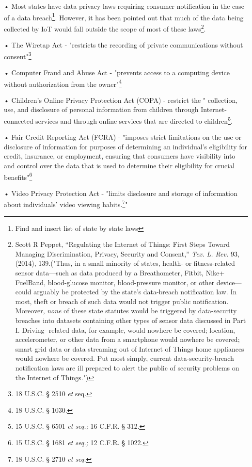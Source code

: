 • Most states have data privacy laws requiring consumer notification in
the case of a data breach\footnote{Find and insert list of state by
  state laws}. However, it has been pointed out that much of the data
being collected by IoT would fall outside the scope of most of these
laws\footnote{Scott R Peppet, ``Regulating the Internet of Things: First
  Steps Toward Managing Discrimination, Privacy, Security and Consent,''
  \emph{Tex. L. Rev.} 93, (2014), 139.("Thus, in a small minority of
  states, health- or fitness-related sensor data---such as data produced
  by a Breathometer, Fitbit, Nike+ FuelBand, blood-glucose monitor,
  blood-pressure monitor, or other device---could arguably be protected
  by the state's data-breach notification law. In most, theft or breach
  of such data would not trigger public notification. Moreover,
  \emph{none} of these state statutes would be triggered by
  data-security breaches into datasets containing other types of sensor
  data discussed in Part I. Driving- related data, for example, would
  nowhere be covered; location, accelerometer, or other data from a
  smartphone would nowhere be covered; smart grid data or data streaming
  out of Internet of Things home appliances would nowhere be covered.
  Put most simply, current data-security-breach notification laws are
  ill prepared to alert the public of security problems on the Internet
  of Things.")}.

• The Wiretap Act - "restricts the recording of private communications
without consent"\footnote{18 U.S.C. § 2510 \emph{et} seq.}

• Computer Fraud and Abuse Act - "prevents access to a computing device
without authorization from the owner"\footnote{18 U.S.C. § 1030.}

• Children's Online Privacy Protection Act (COPA) - restrict the "
collection, use, and disclosure of personal information from children
through Internet-connected services and through online services that are
directed to children\footnote{15 U.S.C. § 6501 \emph{et seq.;} 16 C.F.R.
  § 312.}.

• Fair Credit Reporting Act (FCRA) - "imposes strict limitations on the
use or disclosure of information for purposes of determining an
individual's eligibility for credit, insurance, or employment, ensuring
that consumers have visibility into and control over the data that is
used to determine their eligibility for crucial benefits"\footnote{15
  U.S.C. § 1681 \emph{et seq.;} 12 C.F.R. § 1022.}

• Video Privacy Protection Act - "limits disclosure and storage of
information about individuals' video viewing habits.\footnote{18 U.S.C.
  § 2710 \emph{et seq.}}"

